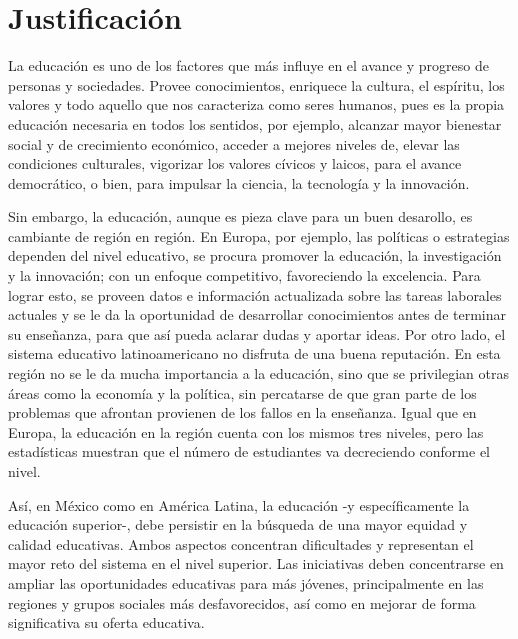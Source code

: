 \section{Justificación}

\noindent
La educación es uno de los factores que más influye en el avance y progreso de personas y sociedades. 
Provee conocimientos, enriquece la cultura, el espíritu, los valores y todo aquello que nos caracteriza 
como seres humanos, pues es la propia educación necesaria en todos los sentidos, por ejemplo, alcanzar 
mayor bienestar social y de crecimiento económico, acceder a mejores niveles de, elevar las condiciones 
culturales, vigorizar los valores cívicos y laicos, para el avance democrático, o bien, para impulsar 
la ciencia, la tecnología y la innovación. \cite{UNAM_Importancia}

\noindent
\newline
Sin embargo, la educación, aunque es pieza clave para un buen desarollo, es cambiante de región en región.
En Europa, por ejemplo, las políticas o estrategias dependen del nivel educativo, se procura promover la 
educación, la investigación y la innovación; con un enfoque competitivo, favoreciendo la  excelencia. 
Para lograr esto, se proveen datos e información actualizada sobre las tareas laborales actuales y 
se le da la oportunidad de desarrollar conocimientos antes de terminar su enseñanza, para que así pueda 
aclarar dudas y aportar ideas. Por otro lado, el sistema educativo latinoamericano no disfruta de una buena 
reputación. En esta región no se le da mucha importancia a la educación, sino que se privilegian otras áreas 
como la economía y la política, sin percatarse de que gran parte de los problemas que afrontan provienen de 
los fallos en la enseñanza. Igual que en Europa, la educación en la región cuenta con los mismos tres niveles,
pero las estadísticas muestran que el número de estudiantes va decreciendo conforme el nivel. \cite{AZ}

\noindent
\newline
Así, en México como en América Latina, la educación -y específicamente la educación superior-, debe persistir
en la búsqueda de una mayor equidad y calidad educativas. Ambos aspectos concentran dificultades y representan 
el mayor reto del sistema en el nivel superior. Las iniciativas deben concentrarse en ampliar las oportunidades 
educativas para más jóvenes, principalmente en las regiones y grupos sociales más 
desfavorecidos, así como en mejorar de forma significativa su oferta educativa. \cite{UNAM_Estado}

